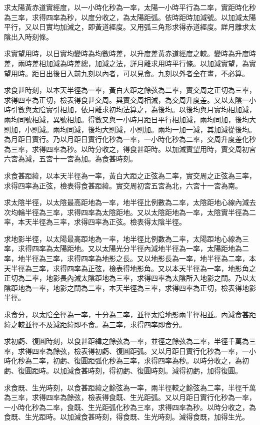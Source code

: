 \begin{pinyinscope}
求太陽黃赤道實經度，以一小時化秒為一率，太陽一小時平行為二率，實距時化秒為三率，求得四率為秒，以度分收之，為太陽距弧。依時距時加減號。以加減太陽平行，又以日實均加減之，即黃道經度。又用弧三角形求得赤道經度。詳月離求太陰出入時刻條。

求實望用時，以日實均變時為均數時差，以升度差黃赤道經度之較。變時為升度時差，兩時差相加減為時差總，加減之法，詳月離求用時平行條。以加減實望，為實望用時。距日出後日入前九刻以內者，可以見食。九刻以外者全在晝，不必算。

求食甚時刻，以本天半徑為一率，黃白大距之餘弦為二率，實交周之正切為三率，求得四率為正切，檢表得食甚交周。與實交周相減，為交周升度差。又以太陰一小時引數與太陰實引相加，依月離求初均法算之，為後均。以後均與月實均相加減，兩均同號相減，異號相加。得數又與一小時月距日平行相加減，兩均同加，後均大則加，小則減。兩均同減，後均大則減，小則加。兩均一加一減，其加減從後均。為月距日實行。乃以月距日實行化秒為一率，一小時化秒為二率，交周升度差化秒為三率，求得四率為秒。以時分收之，得食甚距時。以加減實望用時，實交周初宮六宮為減，五宮十一宮為加。為食甚時刻。

求食甚距緯，以本天半徑為一率，黃白大距之正弦為二率，實交周之正弦為三率，求得四率為正弦，檢表得食甚距緯。實交周初宮五宮為北，六宮十一宮為南。

求太陰半徑，以太陰最高距地為一率，地半徑比例數為二率，太陰距地心線內減去次均輪半徑為三率，求得四率為太陰距地。又以太陰距地為一率，太陰實半徑為二率，本天半徑為三率，求得四率為正弦。檢表得太陰半徑。

求地影半徑，以太陽最高距地為一率，地半徑比例數為二率，太陽距地心線為三率，求得四率為太陽距地。又以太陽光分半徑內減地半徑為一率，太陽距地為二率，地半徑為三率，求得四率為地影之長。又以地影長為一率，地半徑為二率，本天半徑為三率，求得四率為正弦，檢表得地影角。又以本天半徑為一率，地影角之正切為二率，地影長內減太陰距地為三率，求得四率為太陰所入地影之闊。乃以太陰距地為一率，地影之闊為二率，本天半徑為三率，求得四率為正切，檢表得地影半徑。

求食分，以太陰全徑為一率，十分為二率，並徑太陰地影兩半徑相並。內減食甚距緯之較並徑不及減距緯即不食。為三率，求得四率即食分。

求初虧、復圓時刻，以食甚距緯之餘弦為一率，並徑之餘弦為二率，半徑千萬為三率，求得四率為餘弦，檢表得初虧、復圓距弧。又以月距日實行化秒為一率，一小時化秒為二率，初虧、復圓距弧化秒為三率，求得四率為秒。以時分收之，為初虧、復圓距時。以加減食甚時刻，得初虧、復圓時刻。減得初虧，加得復圓。

求食既、生光時刻，以食甚距緯之餘弦為一率，兩半徑較之餘弦為二率，半徑千萬為三率，求得四率為餘弦，檢表得食既、生光距弧。又以月距日實行化秒為一率，一小時化秒為二率，食既、生光距弧化秒為三率，求得四率為秒。以時分收之，為食既、生光距時。以加減食甚時刻，得食既、生光時刻。減得食既，加得生光。


\end{pinyinscope}
